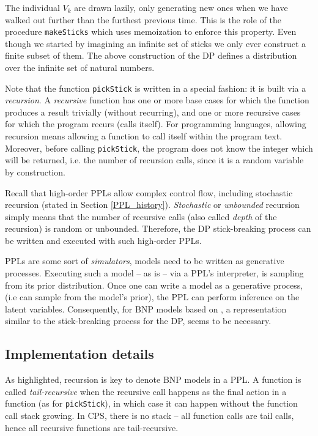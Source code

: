 The individual $V_k$ are drawn lazily, only generating new ones when we have walked out further than the furthest previous time. This is the role of the procedure \texttt{makeSticks} which uses memoization to enforce this property. Even though we started by imagining an infinite set of sticks we only ever construct a finite subset of them. The above construction of the \gls{DP} defines a distribution over the infinite set of natural numbers.

Note that the function \texttt{pickStick} is written in a special fashion: it is built via a \textit{recursion}. A \textit{recursive} function has one or more base cases for which the function produces a result trivially (without recurring), and one or more recursive cases for which the program recurs (calls itself). For programming languages, allowing recursion means allowing a function to call itself within the program text. Moreover, before calling \texttt{pickStick}, the program does not know the integer which will be returned, i.e. the number of recursion calls, since it is a random variable by construction.

Recall that high-order \glspl{PPL} allow complex control flow, including stochastic recursion (stated in Section \ref{PPL_history}). \textit{Stochastic} or \textit{unbounded} recursion simply means that the number of recursive calls (also called \textit{depth} of the recursion) is random or unbounded. Therefore, the \gls{DP} stick-breaking process can be written and executed with such high-order \glspl{PPL}.

\glspl{PPL} are some sort of \textit{simulators}, models need to be written as generative processes. Executing such a model -- as is -- via a \gls{PPL}'s interpreter, is sampling from its prior distribution. Once one can write a model as a generative process, (i.e can sample from the model's prior), the \gls{PPL} can perform inference on the latent variables. Consequently, for \gls{BNP} models based on , a representation similar to the stick-breaking process for the \gls{DP}, seems to be necessary.


\subsection{Implementation details}
As highlighted, recursion is key to denote \gls{BNP} models in a \gls{PPL}.
A function is called \textit{tail-recursive} when the recursive call happens as the final action in a function (as for \texttt{pickStick}), in which case it can happen without the function call stack growing. In \gls{CPS}, there is no stack -- all function calls are tail calls, hence all recursive functions are tail-recursive.

